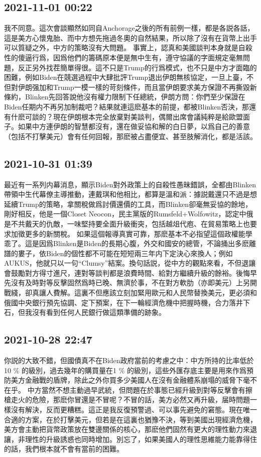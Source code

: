 \documentclass[twocolumn]{ctexart}
\begin{document}
\subsection*{2021-11-01 00:22}

我不同意。這次會談顯然如同自Anchorage之後的所有前例一樣，都是各説各話，這是美方心懷鬼胎、而中方想先拖過冬奧的自然結果，所以除了沒有在貨幣上出手可以質疑之外，中方的策略沒有大問題。
事實上，認真和美國談判本身就是自殺性的傻逼行爲，因爲他們的籌碼原本便是無中生有，遵守協議的字面規定毫無問題，反正另外找茬簡單得很。這不只是Trump的行爲模式，也不只是中方才面臨的困難，例如Biden在競選過程中大肆批評Trump退出伊朗無核協定，一旦上臺，不但對伊朗强加和Trump一模一樣的苛刻條件，而且當伊朗要求美方保證不再撕毀新條約，Blinken先回答說他沒有權力限制下任總統，伊朗方問：你們至少保證在Biden任期内不再另加制裁吧？結果就連這麽基本的前提，都被Blinken否決，那還有什麽可談的？現在伊朗根本完全放棄對美談判，偶爾出席會議純粹是給歐盟面子。如果中方連伊朗的智慧都沒有，還在做妥協和解的白日夢，以爲自己的善意（包括不打擊美元）會有任何回報，那麽被占盡便宜、甚至肢解消化，都是活該。
\subsection*{2021-10-31 01:39}

最近有一系列内幕消息，顯示Biden對外政策上的自殺性愚昧錯誤，全都由Blinken帶領中生代幕僚主導推動，連戴琪和他相比，都算是溫和派：據説戴還只不過是想延續Trump的策略，拿關稅做爲討價還價的工具，而Blinken卻毫無妥協的餘地，剛好相反，他是一個Closet Neocon，民主黨版的Rumsfeld+Wolfowitz，認定中俄是不共戴天的仇敵，一味堅持要全面升級衝突，包括越俎代庖、在貿易策略上也要求加徵更多的新關稅。
如果這個報導真實可靠，那麽基本不必指望這個政權能學乖了。這是因爲Blinken是Biden的長期心腹，外交和國安的總管，不論捅出多麽離譜的婁子，依Biden的個性都不可能在短短兩三年内下定決心來換人；例如AUKUS，他就只以一句“Clumsy”結案。換句話説，從中方的觀點來看，不但退讓會鼓勵對方得寸進尺，連對等談判都是浪費時間、給對方繼續升級的餘裕。後悔早先沒有及時對等反擊固然爲時已晚、無濟於事，不在對方軟肋（亦即美元）上另開戰綫，卻真讓人費解。這裏不但應該立刻加緊用歐元和人民幣替換美元，更必須和俄國中央銀行預先協調、定下預案，在下一輪經濟危機中把握時機，合力落井下石，但我沒有看到任何人民銀行做這類準備的跡象。
\subsection*{2021-10-28 22:47}

你説的大致不錯，但國債真不在Biden政府當前的考慮之中：中方所持的比率低於10 \% 的級別，過去幾年的購買量在1 \% 的級別，這些外匯存底主要是用來作爲預防美方金融戰的盾牌，除此之外你買多少美國人在沒有金融體系崩塌的威脅下毫不在乎。
中方當然不想主動過早武統，但問題在於事態已經升級到對等反擊會有擦槍走火的危險，那麽你冒還是不冒呢？不冒的話，美方必然又再升級，届時問題一樣沒有解決，反而更糟糕。這正是我反復預警過、可以事先避免的窘態。現在唯一合適的方案，在於打擊美元，但若是在這裏也猶豫不決，等到美國出現經濟危機，美方會主動把貨幣政策放在雙邊關係的核心，那麽他們固然有更大的理性動力來退讓，非理性的升級誘惑也同時增加。別忘了，如果美國人的理性思維能力能靠得住的話，我們根本就不會有當前的困難。
\end{document}
